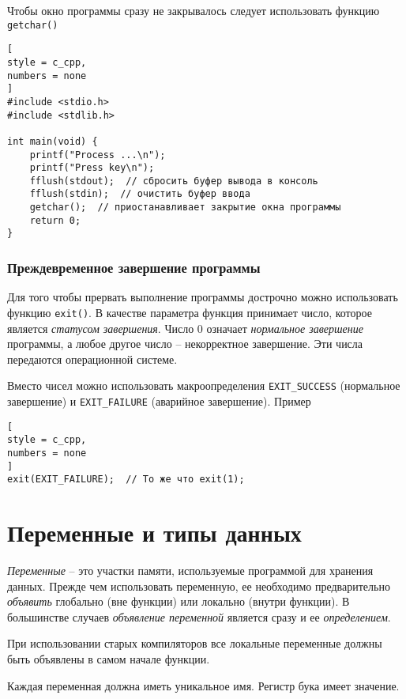 \documentclass[%
	11pt,
	a4paper,
	utf8,
		]{article}
\begin{document}
Чтобы окно программы сразу не закрывалось следует использовать функцию \verb|getchar()|
\begin{lstlisting}[
style = c_cpp,
numbers = none
]
#include <stdio.h>
#include <stdlib.h>

int main(void) {
    printf("Process ...\n");
    printf("Press key\n");
    fflush(stdout);  // сбросить буфер вывода в консоль
    fflush(stdin);  // очистить буфер ввода
    getchar();  // приостанавливает закрытие окна программы
    return 0;
}
\end{lstlisting}

\subsubsection{Преждевременное завершение программы}

Для того чтобы прервать выполнение программы дострочно можно использовать функцию \verb*|exit()|. В качестве параметра функция принимает число, которое является \emph{статусом завершения}. Число 0 означает \emph{нормальное завершение} программы, а любое другое число -- некорректное завершение. Эти числа передаются операционной системе.

Вместо чисел можно использовать макроопределения \verb|EXIT_SUCCESS| (нормальное завершение) и \verb*|EXIT_FAILURE| (аварийное завершение). Пример
\begin{lstlisting}[
style = c_cpp,
numbers = none
]
exit(EXIT_FAILURE);  // То же что exit(1);
\end{lstlisting}



\section{Переменные и типы данных}

\emph{Переменные} -- это участки памяти, используемые программой для хранения данных. Прежде чем использовать переменную, ее необходимо предварительно \emph{объявить} глобально (вне функции) или локально (внутри функции). В большинстве случаев \emph{объявление переменной} является сразу и ее \emph{определением}.

При использовании старых компиляторов все локальные переменные должны быть объявлены в самом начале функции.

Каждая переменная должна иметь уникальное имя. Регистр бука имеет значение.
\end{document}
